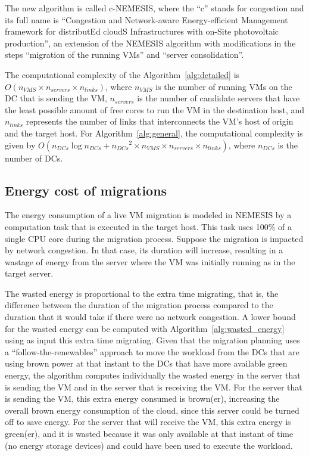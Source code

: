 The new algorithm is called c-NEMESIS, where the ``c'' stands for congestion and its full name is ``Congestion and Network-aware Energy-efficient Management framework for distributEd cloudS Infrastructures with on-Site photovoltaic production'', an extension of the NEMESIS algorithm with modifications in the steps ``migration of the running VMs'' and  ``server consolidation''.


The computational complexity of the Algorithm~\ref{alg:detailed} is $O(n_{VMS} \times  n_{servers} \times n_{links}  )$, where $n_{VMS}$ is the number of running VMs on the DC that is sending the VM, $n_{servers}$ is the number of candidate servers that have the least possible amount of free cores to run the VM in the destination host, and $n_{links}$ represents the number of links that interconnects the VM's host of origin and the target host. For Algorithm~\ref{alg:general}, the computational complexity is given by $O(n_{DCs}\log{}n_{DCs} + {n_{DCs}}^{2} \times n_{VMS} \times  n_{servers} \times n_{links})$, where $n_{DCs}$ is the number of DCs.


\subsection{Energy cost of migrations}\label{sec:energy_costs_mig}

The energy consumption of a live VM migration is modeled in NEMESIS by a computation task that is executed in the target host. This task uses 100\% of a single CPU core during the migration process. Suppose the migration is impacted by network congestion. In that case, its duration will increase, resulting in a wastage of energy from the server where the VM was initially running as in the target server.


The wasted energy is proportional to the extra time migrating, that is, the difference between the duration of the migration process compared to the duration that it would take if there were no network congestion. A lower bound for the wasted energy can be computed with Algorithm~\ref{alg:wasted_energy} using as input this extra time migrating. Given that the migration planning uses a ``follow-the-renewables'' approach to move the workload from the DCs that are using brown power at that instant to the DCs that have more available green energy, the algorithm computes individually the wasted energy in the server that is sending the VM and in the server that is receiving the VM. For the server that is sending the VM, this extra energy consumed is brown(er), increasing the overall brown energy consumption of the cloud, since this server could be turned off to save energy. For the server that will receive the VM, this extra energy is green(er), and it is wasted because it was only available at that instant of time (no energy storage devices) and could have been used to execute the workload.


